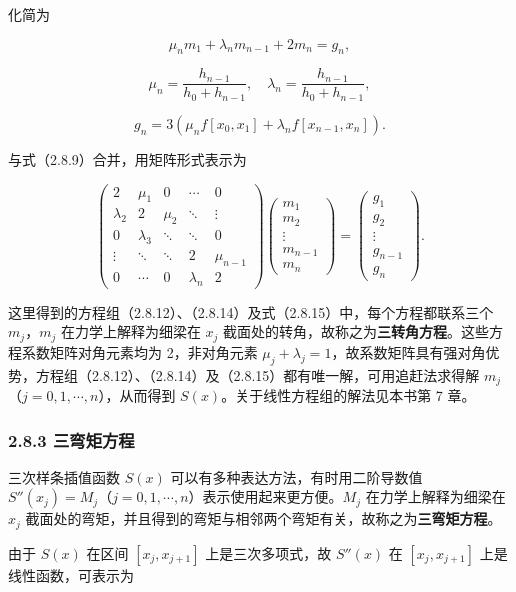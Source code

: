 \documentclass[
  10pt,
  fontset=fandol]{ctexart}
\begin{document}
化简为

\[\mu_nm_1+\lambda_nm_{n-1}+2m_n=g_n,\]

\[\mu_n=\frac{h_{n-1}}{h_0+h_{n-1}},\quad\lambda_n=\frac{h_{n-1}}{h_0+h_{n-1}},\]

\[g_n=3(\mu_nf[x_0,x_1]+\lambda_nf[x_{n-1},x_n]).\]

与式（2.8.9）合并，用矩阵形式表示为

\[\begin{pmatrix}
2&\mu_1&0&\cdots&0\\
\lambda_2&2&\mu_2&\ddots&\vdots\\
0&\lambda_3&\ddots&\ddots&0\\
\vdots&\ddots&\ddots&2&\mu_{n-1}\\
0&\cdots&0&\lambda_n&2
\end{pmatrix}
\begin{pmatrix}m_1\\m_2\\\vdots\\m_{n-1}\\m_n\end{pmatrix}
=\begin{pmatrix}g_1\\g_2\\\vdots\\g_{n-1}\\g_n\end{pmatrix}.\tag{2.8.15}\]

这里得到的方程组（2.8.12）、（2.8.14）及式（2.8.15）中，每个方程都联系三个 \(m_j\)，\(m_j\) 在力学上解释为细梁在 \(x_j\) 截面处的转角，故称之为\textbf{三转角方程}。这些方程系数矩阵对角元素均为 2，非对角元素 \(\mu_j+\lambda_j=1\)，故系数矩阵具有强对角优势，方程组（2.8.12）、（2.8.14）及（2.8.15）都有唯一解，可用追赶法求得解 \(m_j\)（\(j=0,1,\cdots,n\)），从而得到 \(S(x)\)。关于线性方程组的解法见本书第 7 章。

\subsubsection{2.8.3 三弯矩方程}\label{ux4e09ux5f2fux77e9ux65b9ux7a0b}

三次样条插值函数 \(S(x)\) 可以有多种表达方法，有时用二阶导数值 \(S''(x_j)=M_j\)（\(j=0,1,\cdots,n\)）表示使用起来更方便。\(M_j\) 在力学上解释为细梁在 \(x_j\) 截面处的弯矩，并且得到的弯矩与相邻两个弯矩有关，故称之为\textbf{三弯矩方程}。

由于 \(S(x)\) 在区间 \([x_j,x_{j+1}]\) 上是三次多项式，故 \(S''(x)\) 在 \([x_j,x_{j+1}]\) 上是线性函数，可表示为
\end{document}
